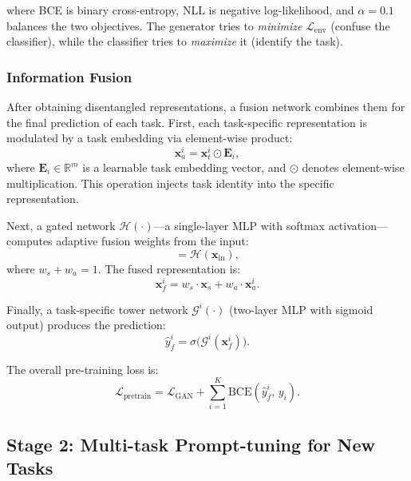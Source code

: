 \documentclass[review,anonymous]{acmart}
\begin{document}
where BCE is binary cross-entropy, NLL is negative log-likelihood, and
$\alpha = 0.1$ balances the two objectives. The generator tries to
\emph{minimize} $\mathcal{L}_{\text{env}}$ (confuse the classifier), while
the classifier tries to \emph{maximize} it (identify the task).

\subsubsection{Information Fusion}

After obtaining disentangled representations, a fusion network combines them for
the final prediction of each task. First, each task-specific representation is
modulated by a task embedding via element-wise product:
\begin{equation}
  \mathbf{x}_a^i = \mathbf{x}_t^i \odot \mathbf{E}_i,
  \label{eq:task_aware}
\end{equation}
where $\mathbf{E}_i \in \mathbb{R}^m$ is a learnable task embedding vector, and
$\odot$ denotes element-wise multiplication. This operation injects task identity
into the specific representation.

Next, a gated network $\mathcal{H}(\cdot)$---a single-layer MLP with softmax
activation---computes adaptive fusion weights from the input:
\begin{equation}
  [w_s,\, w_a] = \mathcal{H}(\mathbf{x}_{\text{in}}),
  \label{eq:gate}
\end{equation}
where $w_s + w_a = 1$. The fused representation is:
\begin{equation}
  \mathbf{x}_f^i = w_s \cdot \mathbf{x}_s + w_a \cdot \mathbf{x}_a^i.
  \label{eq:fusion}
\end{equation}

Finally, a task-specific tower network $\mathcal{G}^i(\cdot)$ (two-layer MLP with
sigmoid output) produces the prediction:
\begin{equation}
  \hat{y}_f^i = \sigma\big(\mathcal{G}^i(\mathbf{x}_f^i)\big).
  \label{eq:prediction}
\end{equation}

The overall pre-training loss is:
\begin{equation}
  \mathcal{L}_{\text{pretrain}} = \mathcal{L}_{\text{GAN}} + \sum_{i=1}^{K} \text{BCE}(\hat{y}_f^i,\, y_i).
  \label{eq:total_loss}
\end{equation}

\subsection{Stage 2: Multi-task Prompt-tuning for New Tasks}
\end{document}
